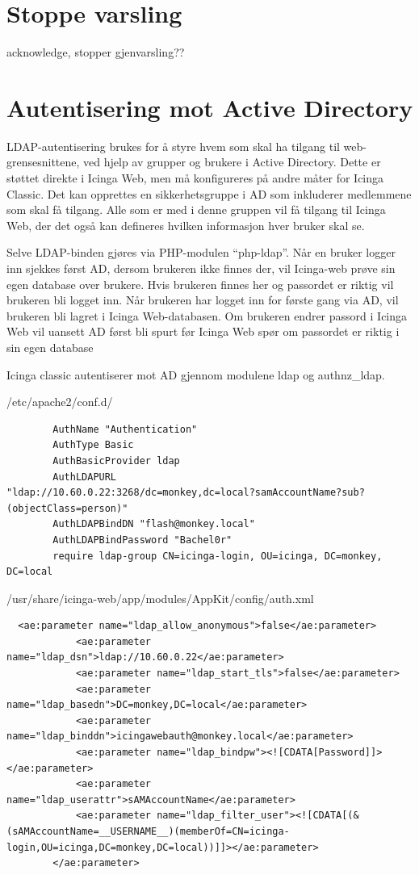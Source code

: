 \section{Stoppe varsling}
acknowledge, stopper gjenvarsling??
\section{Autentisering mot Active Directory} 
LDAP-autentisering brukes for å styre hvem som skal ha tilgang til web-grensesnittene, ved hjelp av grupper og brukere i Active Directory. Dette er støttet direkte i Icinga Web, men må konfigureres på andre måter for Icinga Classic. Det kan opprettes en sikkerhetsgruppe i AD som inkluderer medlemmene som skal få tilgang. Alle som er med i denne gruppen vil få tilgang til Icinga Web, der det også kan defineres hvilken informasjon hver bruker skal se. 

Selve LDAP-binden gjøres via PHP-modulen “php-ldap”. Når en bruker logger inn sjekkes først AD, dersom brukeren ikke finnes der, vil Icinga-web prøve sin egen database over brukere. Hvis brukeren finnes her og passordet er riktig vil brukeren bli logget inn. Når brukeren har logget inn for første gang via AD, vil brukeren bli lagret i Icinga Web-databasen. Om brukeren endrer passord i Icinga Web vil uansett AD først bli spurt før Icinga Web spør om passordet er riktig i sin egen database

Icinga classic autentiserer mot AD gjennom modulene ldap og authnz\_ldap.

/etc/apache2/conf.d/
\begin{lstlisting}
        AuthName "Authentication"
        AuthType Basic
        AuthBasicProvider ldap
        AuthLDAPURL
"ldap://10.60.0.22:3268/dc=monkey,dc=local?samAccountName?sub?(objectClass=person)"
        AuthLDAPBindDN "flash@monkey.local"
        AuthLDAPBindPassword "Bachel0r"
        require ldap-group CN=icinga-login, OU=icinga, DC=monkey, DC=local
\end{lstlisting}

/usr/share/icinga-web/app/modules/AppKit/config/auth.xml
\begin{lstlisting}
  <ae:parameter name="ldap_allow_anonymous">false</ae:parameter>
            <ae:parameter name="ldap_dsn">ldap://10.60.0.22</ae:parameter>
            <ae:parameter name="ldap_start_tls">false</ae:parameter>
            <ae:parameter name="ldap_basedn">DC=monkey,DC=local</ae:parameter>
            <ae:parameter name="ldap_binddn">icingawebauth@monkey.local</ae:parameter>
            <ae:parameter name="ldap_bindpw"><![CDATA[Password]]></ae:parameter>
            <ae:parameter name="ldap_userattr">sAMAccountName</ae:parameter>
            <ae:parameter name="ldap_filter_user"><![CDATA[(&(sAMAccountName=__USERNAME__)(memberOf=CN=icinga-login,OU=icinga,DC=monkey,DC=local))]]></ae:parameter>
        </ae:parameter>
\end{lstlisting}

